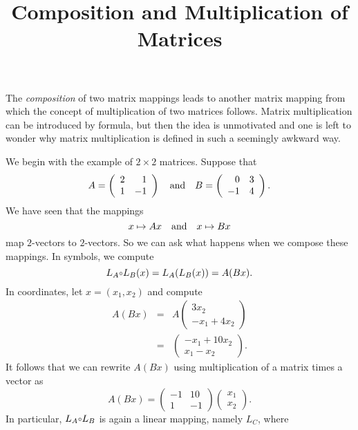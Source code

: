 \documentclass{ximera}
\title{Composition and Multiplication of Matrices}
\begin{document}
\begin{abstract}
\end{abstract}
\maketitle

 \label{S:4.6}
 

The {\em composition\/} of two matrix mappings leads to another
matrix mapping from which the concept of multiplication of two
matrices follows.  Matrix multiplication can be introduced by
formula, but then the idea is unmotivated and one is left to
wonder why matrix multiplication is defined in such a seemingly
awkward way.

We begin with the example of $2\times 2$ matrices.  Suppose that
\[
A= \left(\begin{array}{rr} 2 & 1\\ 1 & -1\end{array}\right)
\quad\mbox{and}\quad
B= \left(\begin{array}{rr} 0 & 3\\ -1 & 4\end{array}\right).
\]
We have seen that the mappings
\[
x\mapsto Ax \quad\mbox{and}\quad x\mapsto Bx
\]
map $2$-vectors to $2$-vectors.  So we can ask what happens when
we compose these mappings.  In symbols, we compute
\[
L_A\compose L_B (x) = L_A(L_B(x))= A(Bx).
\]
In coordinates, let $x=(x_1, x_2)$ and compute
\begin{eqnarray*}
A(Bx) & = & A \left(\begin{array}{c} 3x_2 \\ -x_1+4x_2
\end{array}\right)\\
 & = & \left(\begin{array}{c} -x_1+10x_2  \\ x_1-x_2
\end{array}\right).
\end{eqnarray*}
It follows that we can rewrite $A(Bx)$ using multiplication of a
matrix times a vector as
\[
A(Bx) = \left(\begin{array}{rr} -1 & 10 \\ 1 & -1
\end{array}\right)
        \left(\begin{array}{c} x_1 \\ x_2 \end{array} \right).
\]
In particular, $L_A\compose L_B$ is again a linear mapping,
namely $L_C$, where
\end{document}
